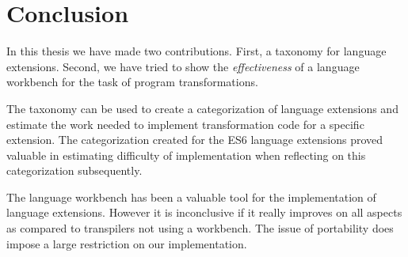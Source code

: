 
\chapter{Conclusion} %

\label{Chapter7} 


In this thesis we have made two contributions. First, a taxonomy for language extensions. Second, we have tried to show the \textit{effectiveness} of a language workbench for the task of program transformations. 

The taxonomy can be used to create a categorization of language extensions and estimate the work needed to implement transformation code for a specific extension. The categorization created for the ES6 language extensions proved valuable in estimating difficulty of implementation when reflecting on this categorization subsequently.

The language workbench has been a valuable tool for the implementation of language extensions. However it is inconclusive if it really improves on all aspects as compared to transpilers not using a workbench. The issue of portability does impose a large restriction on our implementation. 